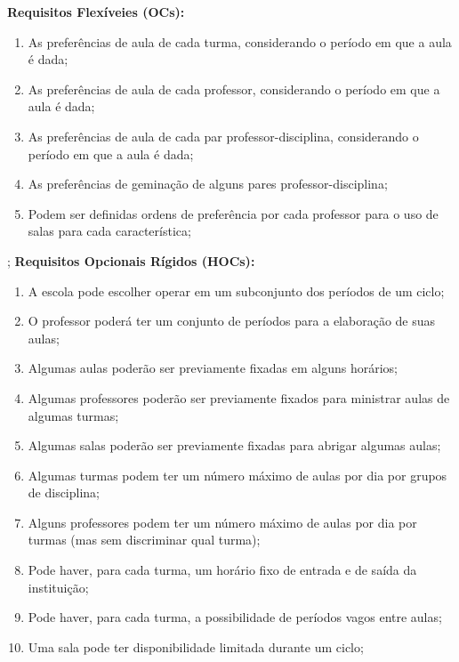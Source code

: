 \documentclass[12pt,a4paper]{article}
\begin{document}
			\textbf{Requisitos Flexíveies (OCs):}
			\begin{enumerate}
				\item As preferências de aula de cada turma, considerando o período em que a aula é dada;
				\item As preferências de aula de cada professor, considerando o período em que a aula é dada;
				\item As preferências de aula de cada par professor-disciplina, considerando o período em que a aula é dada;
				\item As preferências de geminação de alguns pares professor-disciplina;
				\item Podem ser definidas ordens de preferência por cada professor para o uso de salas para cada característica;
			\end{enumerate}
;
			\textbf{Requisitos Opcionais Rígidos (HOCs):}
			\begin{enumerate}
				\item A escola pode escolher operar em um subconjunto dos períodos de um ciclo;
				\item O professor poderá ter um conjunto de períodos para a elaboração de suas aulas;
				\item Algumas aulas poderão ser previamente fixadas em alguns horários;
				\item Algumas professores poderão ser previamente fixados para ministrar aulas de algumas turmas;
				\item Algumas salas poderão ser previamente fixadas para abrigar algumas aulas;
				\item Algumas turmas podem ter um número máximo de aulas por dia por grupos de disciplina;
				\item Alguns professores podem ter um número máximo de aulas por dia por turmas (mas sem discriminar qual turma);
				\item Pode haver, para cada turma, um horário fixo de entrada e de saída da instituição;
				\item Pode haver, para cada turma, a possibilidade de períodos vagos entre aulas;
				\item Uma sala pode ter disponibilidade limitada durante um ciclo;


			\end{enumerate}



	\newpage

\end{document}
